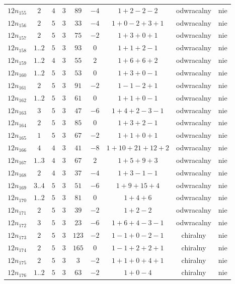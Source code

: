 \begin{longtable}{ccccccccc}
$12n_{155}$ & $2$ & $4$ & $3$ & $89$ & $-4$ & $1+2-2-2$ & odwracalny & nie \\
$12n_{156}$ & $2$ & $5$ & $3$ & $33$ & $-4$ & $1+0-2+3+1$ & odwracalny & nie \\
$12n_{157}$ & $2$ & $5$ & $3$ & $75$ & $-2$ & $1+3+0+1$ & odwracalny & nie \\
$12n_{158}$ & $1..2$ & $5$ & $3$ & $93$ & $0$ & $1+1+2-1$ & odwracalny & nie \\
$12n_{159}$ & $1..2$ & $4$ & $3$ & $55$ & $2$ & $1+6+6+2$ & odwracalny & nie \\
$12n_{160}$ & $1..2$ & $5$ & $3$ & $53$ & $0$ & $1+3+0-1$ & odwracalny & nie \\
$12n_{161}$ & $2$ & $5$ & $3$ & $91$ & $-2$ & $1-1-2+1$ & odwracalny & nie \\
$12n_{162}$ & $1..2$ & $5$ & $3$ & $61$ & $0$ & $1+1+0-1$ & odwracalny & nie \\
$12n_{163}$ & $3$ & $5$ & $3$ & $47$ & $-6$ & $1+4+2-3-1$ & odwracalny & nie \\
$12n_{164}$ & $2$ & $5$ & $3$ & $85$ & $0$ & $1+3+2-1$ & odwracalny & nie \\
$12n_{165}$ & $1$ & $5$ & $3$ & $67$ & $-2$ & $1+1+0+1$ & odwracalny & nie \\
$12n_{166}$ & $4$ & $4$ & $3$ & $41$ & $-8$ & $1+10+21+12+2$ & odwracalny & nie \\
$12n_{167}$ & $1..3$ & $4$ & $3$ & $67$ & $2$ & $1+5+9+3$ & odwracalny & nie \\
$12n_{168}$ & $2$ & $4$ & $3$ & $37$ & $-4$ & $1+3-1-1$ & odwracalny & nie \\
$12n_{169}$ & $3..4$ & $5$ & $3$ & $51$ & $-6$ & $1+9+15+4$ & odwracalny & nie \\
$12n_{170}$ & $1..2$ & $5$ & $3$ & $81$ & $0$ & $1+4+6$ & odwracalny & nie \\
$12n_{171}$ & $2$ & $5$ & $3$ & $39$ & $-2$ & $1+2-2$ & odwracalny & nie \\
$12n_{172}$ & $3$ & $5$ & $3$ & $23$ & $-6$ & $1+6+4-3-1$ & odwracalny & nie \\
$12n_{173}$ & $2$ & $5$ & $3$ & $123$ & $-2$ & $1-1+0-2-1$ & chiralny & nie \\
$12n_{174}$ & $2$ & $5$ & $3$ & $165$ & $0$ & $1-1+2+2+1$ & chiralny & nie \\
$12n_{175}$ & $2$ & $5$ & $3$ & $3$ & $-2$ & $1+1+0+4+1$ & chiralny & nie \\
$12n_{176}$ & $1..2$ & $5$ & $3$ & $63$ & $-2$ & $1+0-4$ & chiralny & nie \\

\end{longtable}
